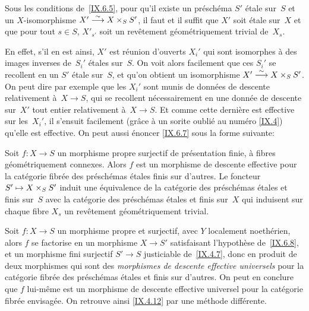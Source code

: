 \begin{corollaire}
\label{IX.6.7}
Sous les conditions de~\ref{IX.6.5}, pour qu'il existe un
pr\'esch\'ema $S'$ \'etale sur~$S$ et un $X$-isomorphisme
$X'\overset{\sim}{\longrightarrow} X\times_S S'$, il faut et il suffit que $X'$ soit \'etale
sur~$X$ et que pour tout $s\in S$, $X'_{s'}$ soit un rev\^etement
g\'eom\'etriquement trivial de~$X_s$.
\end{corollaire}

En effet, s'il en est ainsi, $X'$ est r\'eunion d'ouverts $X_i'$ qui
sont isomorphes \`a des images inverses de~$S_i'$ \'etales
sur~$S$. On voit alors facilement que ces $S_i'$ se recollent en un
$S'$ \'etale sur~$S$, et qu'on obtient un isomorphisme $X'\overset{\sim}{\longrightarrow}
X\times_S S'$. On peut dire par exemple que les $X_i'$ sont munis de
donn\'ees de descente relativement \`a~$X\to S$, qui se recollent
n\'ecessairement en une donn\'ee de descente sur~$X'$ tout entier
relativement \`a~$X\to S$. Et comme cette derni\`ere est effective
sur les~$X_i'$, il s'ensuit facilement (gr\^ace \`a un sorite
oubli\'e au num\'ero \ref{IX.4}) qu'elle est effective. On peut aussi
\'enoncer \ref{IX.6.7} sous la forme suivante:

\begin{corollaire}
\label{IX.6.8}
Soit $f\colon X\to S$ un morphisme propre surjectif de
pr\'esentation finie, \`a fibres g\'eom\'etriquement
connexes. Alors $f$ est un morphisme de descente effective pour la
cat\'egorie fibr\'ee des pr\'esch\'emas \'etales finis sur
d'autres. Le foncteur $S'\mto X\times_S S'$ induit une
\'equivalence de la cat\'egorie des pr\'esch\'emas \'etales
et finis sur~$S$ avec la cat\'egorie des pr\'esch\'emas
\'etales et finis sur~$X$ qui induisent sur chaque fibre $X_s$ un
rev\^etement g\'eom\'etriquement trivial.
\end{corollaire}

\begin{remarque}
\label{IX.6.9}
Soit $f\colon X\to S$ un morphisme propre et surjectif, avec $Y$
localement noeth\'erien, alors $f$ se factorise en un morphisme
$X\to S'$ satisfaisant l'hypoth\`ese de~\ref{IX.6.8}, et un
morphisme fini surjectif $S'\to S$ justiciable de~\ref{IX.4.7}, donc
en produit de deux morphismes qui sont des \emph{morphismes de
descente effective universels} pour la cat\'egorie fibr\'ee des
pr\'esch\'emas \'etales et finis sur d'autres. On peut en
conclure que $f$ lui-m\^eme est un morphisme de descente effective
universel pour la cat\'egorie fibr\'ee envisag\'ee. On retrouve
ainsi \ref{IX.4.12} par une m\'ethode diff\'erente.
\end{remarque}

